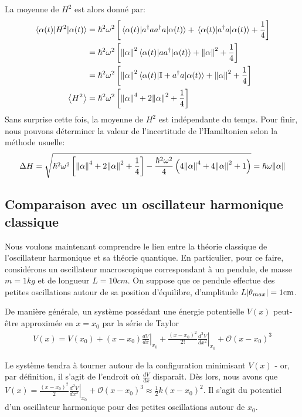 \documentclass[11pt,oneside,a4paper]{article}
\newcommand{\h}{\ensuremath{\hbar}}
\begin{document}
La moyenne de $H^2$ est alors donné par:
\begin{align}
  \expval{H^2}{\alpha(t)} &= \h^2\omega^2\left[\expval{a^\dagger a a^\dagger a}{\alpha(t)}+\expval{a^\dagger a}{\alpha(t)}+\frac{1}{4}\right]\\
  &= \h^2\omega^2\left[\norm{\alpha}^2\expval{aa^\dagger}{\alpha(t)}+\norm{\alpha}^2+\frac{1}{4}\right]\\
  &= \h^2\omega^2\left[\norm{\alpha}^2\expval{\mathbb{I}+a^\dagger a}{\alpha(t)}+\norm{\alpha}^2+\frac{1}{4}\right]\\
  \expval{H^2}&= \h^2\omega^2\left[\norm{\alpha}^4+2\norm{\alpha}^2+\frac{1}{4}\right]
\end{align}
Sans surprise cette fois, la moyenne de $H^2$ est indépendante du temps. Pour finir, nous pouvons déterminer la valeur de l'incertitude de l'Hamiltonien selon la méthode usuelle:
\begin{align}
  \label{delta H}
  \Delta H = \sqrt{\h^2\omega^2\left[\norm{\alpha}^4+2\norm{\alpha}^2+\frac{1}{4}\right]-\frac{\h^2\omega^2}{4}\left(4\norm{\alpha}^4+4\norm{\alpha}^2+1\right)} = \h\omega\norm{\alpha}
\end{align}

\subsection{Comparaison avec un oscillateur harmonique classique}

Nous voulons maintenant comprendre le lien entre la théorie classique de l'oscillateur harmonique et sa théorie quantique. En particulier, pour ce faire, considérons un oscillateur macroscopique correspondant à un pendule, de masse $m=1\si{kg}$ et de longueur $L = 10\si{cm}$. On suppose que ce pendule effectue des petites oscillations autour de sa position d'équilibre, d'amplitude $L\absolutevalue{\theta_{max}}=1\si{cm}$.

De manière générale, un système possédant une énergie potentielle $V(x)$ peut-être approximée en $x=x_0$ par la série de Taylor
\begin{align}
  V(x) = V(x_0) + \left(x-x_0\right)\left.\frac{dV}{dx}\right|_{x_0} + \frac{\left(x-x_0\right)^2}{2!} \left.\frac{d^2V}{dx^2}\right|_{x_0} + \mathcal O(x-x_0)^3
\end{align} 

Le système tendra à tourner autour de la configuration minimisant $V(x)$ - or, par définition, il s'agit de l'endroit où $\frac{dV}{dx}$ disparaît. Dès lors, nous avons que $V(x) = \frac{\left(x-x_0\right)^2}{2} \left.\frac{d^2V}{dx^2}\right|_{x_0} + \mathcal O(x-x_0)^3 \approx \frac{1}{2}k\left(x-x_0\right)^2$. Il s'agit du potentiel d'un oscillateur harmonique pour des petites oscillations autour de $x_0$.
\end{document}
